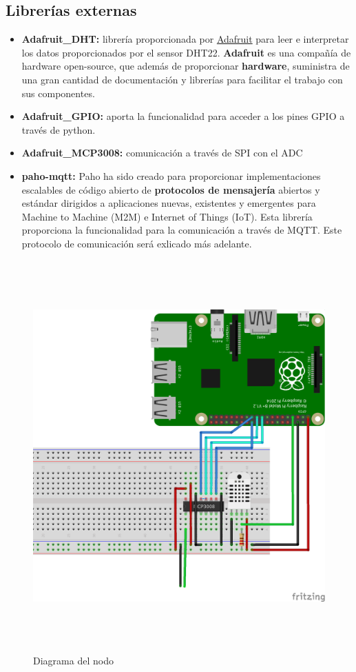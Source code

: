 \subsection{Librerías externas}

\begin{itemize}  
\item \textbf{Adafruit\_DHT:} librería proporcionada por \href{https://www.adafruit.com/}{Adafruit} para leer e interpretar los datos proporcionados por el sensor DHT22. \textbf{Adafruit} es una compañía de hardware open-source, que además de proporcionar \textbf{hardware}, suministra de una gran cantidad de documentación y librerías para facilitar el trabajo con sus componentes. 
\item \textbf{Adafruit\_GPIO:} aporta la funcionalidad para acceder a los pines GPIO a través de python.
\item \textbf{Adafruit\_MCP3008:} comunicación a través de SPI con el ADC
\item \textbf{paho-mqtt:} Paho ha sido creado para proporcionar implementaciones escalables de código abierto de \textbf{protocolos de mensajería} abiertos y estándar dirigidos a aplicaciones nuevas, existentes y emergentes para Machine to Machine (M2M) e Internet of Things (IoT). Esta librería proporciona la funcionalidad para la comunicación a través de MQTT. Este protocolo de comunicación será exlicado más adelante.
\end{itemize}

\begin{figure}[htb]
	
	\begin{center}
		\includegraphics[width=15cm,height=15cm]{figures/solar_project_node_diagram.png}
		\caption{Diagrama del nodo}
	\end{center}
	
	\label{node-diagram}
\end{figure}

